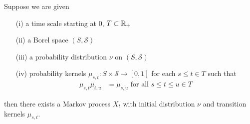 \begin{thm}\label{ExistenceMarkovProcess}Suppose we are given
\begin{itemize}
\item[(i)] a  time scale starting at $0$, $T \subset \mathbb{R}_+$ 
\item[(ii)]a Borel space $(S, \mathcal{S})$ 
\item[(iii)]a probability distribution $\nu$ on $(S, \mathcal{S})$
\item[(iv)]probability kernels $\mu_{s,t} : S \times
  \mathcal{S} \to [0,1]$ for each $s \leq t \in T$ such that 
\begin{align*}
\mu_{s,t} \mu_{t,u} &= \mu_{s,u} \text{ for all $s\leq
  t\leq u \in T$}
\end{align*}
\end{itemize} 
then there exists a Markov process $X_t$ with initial distribution
$\nu$ and transition kernels $\mu_{s,t}$.
\end{thm}
